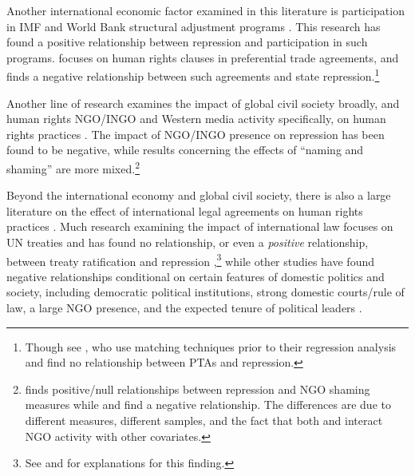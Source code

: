 \documentclass[12pt]{article}
\begin{document}
Another international economic factor examined in this literature is participation in IMF and World Bank structural adjustment programs \citep{AbouharbCingranelli2006, AbouharbCingranelli2007}. This research has found a positive relationship between repression and participation in such programs. \citet{HafnerBurton2005io} focuses on human rights clauses in preferential trade agreements, and finds a negative relationship between such agreements and state repression.\footnote{Though see \citet{SpilkerBohmelt2012}, who use matching techniques prior to their regression analysis and find no relationship between PTAs and repression.} 

Another line of research examines the impact of global civil society broadly, and human rights NGO/INGO and Western media activity specifically, on human rights practices \citep{HafnerBurtonTsutsui2005,Franklin2008,HafnerBurton2008,MurdieDavis2012}. The impact of NGO/INGO presence on repression has been found to be negative, while results concerning the effects of ``naming and shaming'' are more mixed.\footnote{\citet{HafnerBurton2008} finds positive/null relationships between repression and NGO shaming measures while \citet{Franklin2008} and \citet{MurdieDavis2012} find a negative relationship. The differences are due to different measures, different samples, and the fact that both \citet{Franklin2008} and \citet{MurdieDavis2012} interact NGO activity with other covariates.} 

Beyond the international economy and global civil society, there is also a large literature on the effect of international legal agreements on human rights practices \citep{Keith1999,Hathaway2002,Neumayer2005,Simmons2009,PowellStaton2009,Hill2010,ConradRitter2013,Lupu2013}. Much research examining the impact of international law focuses on UN treaties and has found no relationship, or even a {\em positive} relationship, between treaty ratification and repression \citep{Keith1999,Hathaway2002,Hill2010},\footnote{See \citet{Vreeland2008} and \citet{HollyerRosendorff2011} for explanations for this finding.} while other studies have found negative relationships conditional on certain features of domestic politics and society, including democratic political institutions, strong domestic courts/rule of law, a large NGO presence, and the expected tenure of political leaders \citep{Neumayer2005,Simmons2009,ConradRitter2013}. 
\end{document}
